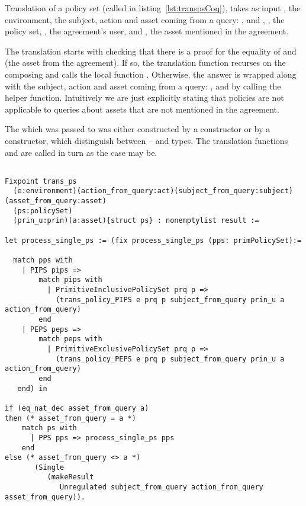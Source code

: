 Translation of a policy set (called  in listing~\ref{lst:transpsCoq}), takes as input , the environment, the subject, action and asset coming from a query: ,  and , , the policy set, , the agreement's user, and , the asset mentioned in the agreement. 

The translation starts with checking that there is a proof for the equality of  and  (the asset from the agreement). If so, the translation function recurses on the composing  and calls the local function . Otherwise, the  answer is wrapped along with the subject, action and asset coming from a query: ,  and  by calling the  helper function. Intuitively we are just explicitly stating that policies are not applicable to queries about assets that are not mentioned in the agreement. 

The  which was passed to  was either constructed by a  constructor or by a  constructor, which distinguish between -- and  types. The translation functions  and  are called in turn as the case may be.


\begin{lstlisting}

Fixpoint trans_ps
  (e:environment)(action_from_query:act)(subject_from_query:subject)(asset_from_query:asset)
  (ps:policySet)
  (prin_u:prin)(a:asset){struct ps} : nonemptylist result :=

let process_single_ps := (fix process_single_ps (pps: primPolicySet):=
  
  match pps with 
    | PIPS pips => 
        match pips with 
          | PrimitiveInclusivePolicySet prq p => 
            (trans_policy_PIPS e prq p subject_from_query prin_u a action_from_query)                
        end
    | PEPS peps => 
        match peps with 
          | PrimitiveExclusivePolicySet prq p => 
            (trans_policy_PEPS e prq p subject_from_query prin_u a action_from_query)
        end  
   end) in

if (eq_nat_dec asset_from_query a)
then (* asset_from_query = a *)  
    match ps with
      | PPS pps => process_single_ps pps
    end
else (* asset_from_query <> a *)
       (Single 
          (makeResult 
             Unregulated subject_from_query action_from_query asset_from_query)).
\end{lstlisting}





